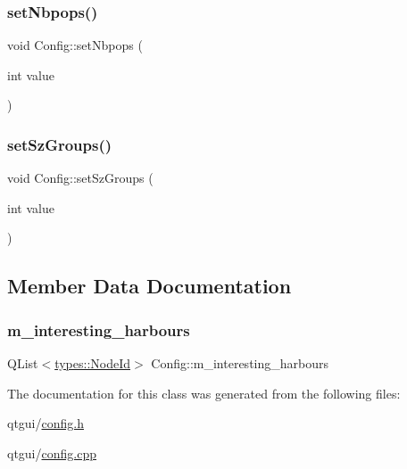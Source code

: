 \subsubsection{\texorpdfstring{setNbpops()}{setNbpops()}}
{\footnotesize\ttfamily void Config\+::set\+Nbpops (\begin{DoxyParamCaption}\item[{int}]{value }\end{DoxyParamCaption})}

\mbox{\label{class_config_a19b1b398c3978c67c0bd2502a3be438a}} 
\subsubsection{\texorpdfstring{setSzGroups()}{setSzGroups()}}
{\footnotesize\ttfamily void Config\+::set\+Sz\+Groups (\begin{DoxyParamCaption}\item[{int}]{value }\end{DoxyParamCaption})}



\subsection{Member Data Documentation}
\mbox{\label{class_config_a412f802599694d3259049599c344e267}} 
\subsubsection{\texorpdfstring{m\_interesting\_harbours}{m\_interesting\_harbours}}
{\footnotesize\ttfamily Q\+List$<$\mbox{\hyperlink{classtypes_1_1_node_id}{types\+::\+Node\+Id}}$>$ Config\+::m\+\_\+interesting\+\_\+harbours}



The documentation for this class was generated from the following files\+:\begin{DoxyCompactItemize}
\item 
qtgui/\mbox{\hyperlink{config_8h}{config.\+h}}\item 
qtgui/\mbox{\hyperlink{config_8cpp}{config.\+cpp}}\end{DoxyCompactItemize}
